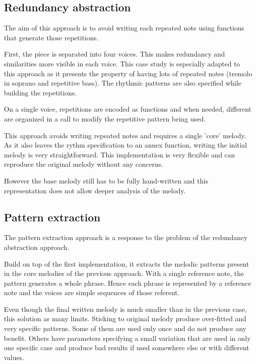 \documentclass[twocolumn, 11pt]{article}
\begin{document}
\subsection{Redundancy abstraction}

The aim of this approach is to avoid writing each repeated note using functions that generate those repetitions.

First, the piece is separated into four voices. This makes redundancy and similarities more visible in each voice. This case study is especially adapted to this approach as it presents the property of having lots of repeated notes (tremolo in soprano and repetitive bass).
The rhythmic patterns are also specified while building the repetitions.

On a single voice, repetitions are encoded as  functions and when needed, different  are organized in a  call to modify the repetitive pattern being used.

This approach avoids writing repeated notes and requires a single 'core' melody. As it also leaves the rythm specification to an annex function, writing the initial melody is very straightforward.
This implementation is very flexible and can reproduce the original melody without any concerns.

However the base melody still has to be fully hand-written and this representation does not allow deeper analysis of the melody.

\subsection{Pattern extraction}

The pattern extraction approach is a response to the problem of the redundancy abstraction approach.

Build on top of the first implementation, it extracts the melodic patterns present in the core melodies of the previous approach. With a single reference note, the pattern generates a whole phrase. Hence each phrase is represented by a reference note and the voices are simple sequences of those referent.


Even though the final written melody is much smaller than in the previous case, this solution as many limits.
Sticking to original melody produce over-fitted and very specific patterns. Some of them are used only once and do not produce any benefit. Others have parameters specifying a small variation that are used in only one specific case and produce bad results if used somewhere else or with different values.
\end{document}
